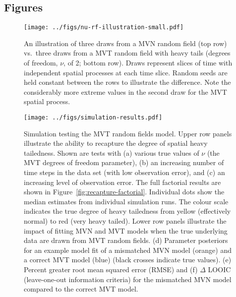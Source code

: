 \documentclass[12pt,english]{article}
\begin{document}
\begin{spacing}{1.9}
\setlength{\bibsep}{0pt plus 0ex}



\clearpage

\section{Figures}

\begin{figure}[htb]
  \begin{center}
    \texttt{[image: ../figs/nu-rf-illustration-small.pdf]}
    \caption{An illustration of three draws from a MVN random field (top row)
      vs.\ three draws from a MVT random field with heavy tails
      (degrees of freedom, $\nu$, of 2; bottom row).
      Draws represent slices of time with independent spatial
      processes at each time slice.
      Random seeds are held constant between the rows
      to illustrate the difference.
      Note the considerably more extreme values in
      the second draw for the MVT spatial process.}
    \label{fig:nu}
  \end{center}
\end{figure}

\clearpage

\begin{figure}[htb]
  \begin{center}
    \texttt{[image: ../figs/simulation-results.pdf]}
    \caption{Simulation testing the MVT random fields model.
      Upper row
      panels illustrate the ability to recapture the
      degree of spatial heavy tailedness.
      Shown are tests with
      (a) various true values of $\nu$ (the MVT degrees of freedom parameter),
      (b) an increasing number of time steps in the data set (with low observation error),
      and (c) an increasing level of observation error.
      The full factorial results are shown in Figure~\ref{fig:recapture-factorial}.
      Individual dots show the median estimates from individual simulation runs.
      The colour scale indicates the true degree of heavy tailedness from
      yellow (effectively normal) to red (very heavy tailed).
      Lower row panels illustrate the impact of fitting MVN and MVT models
      when the true underlying data are drawn from MVT random fields.
      (d) Parameter posteriors for an
      example model fit of a mismatched MVN model (orange)
      and a correct MVT model (blue) (black crosses indicate true values).
      (e) Percent greater root mean squared error (RMSE)
      and (f) $\Delta$ LOOIC (leave-one-out information criteria)
      for the mismatched MVN model compared to the correct MVT model.
    }
    \label{fig:recapture}
  \end{center}
\end{figure}


\end{spacing}
\end{document}

